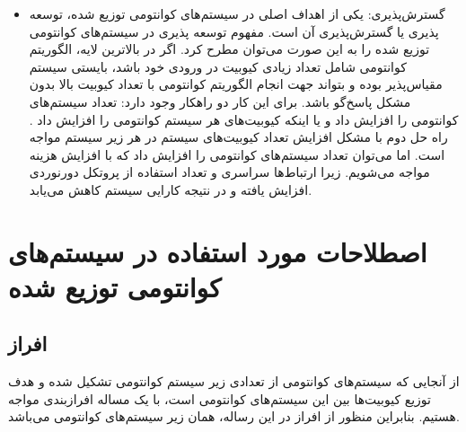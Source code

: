 \begin{itemize}
\item
گسترش‌پذیری: یکی از اهداف اصلی در سیستم‌های کوانتومی توزیع شده، توسعه پذیری یا گسترش‌پذیری آن است. مفهوم توسعه پذیری در سیستم‌های کوانتومی توزیع شده را به این صورت می‌توان مطرح کرد. اگر در بالاترین لایه، الگوریتم کوانتومی شامل تعداد زیادی کیوبیت در ورودی خود باشد، بایستی سیستم مقیاس‌پذیر بوده و بتواند جهت انجام الگوریتم کوانتومی با تعداد کیوبیت بالا بدون مشکل پاسخ‌گو باشد. برای این کار دو راهکار وجود دارد: تعداد سیستم‌های کوانتومی را افزایش داد  و یا اینکه کیوبیت‌های هر سیستم کوانتومی را افزایش داد . راه حل دوم با مشکل افزایش تعداد کیوبیت‌های سیستم در هر زیر سیستم مواجه است. اما ‌می‌توان تعداد سیستم‌های کوانتومی را افزایش داد که با افزایش هزینه مواجه می‌شویم. زیرا ارتباط‌ها سراسری و تعداد استفاده از پروتکل دورنوردی افزایش یافته و در نتیجه کارایی سیستم کاهش می‌یابد. 
\end{itemize}





\section{ اصطلاحات مورد استفاده در سیستم‌های کوانتومی توزیع شده}
\subsection{افراز}
از آنجایی که سیستم‌های کوانتومی از تعدادی زیر سیستم کوانتومی تشکیل شده و هدف توزیع کیوبیت‌‌ها بین این سیستم‌های کوانتومی است، با یک مساله افرازبندی مواجه هستیم. بنابراین منظور از افراز در این رساله، همان زیر سیستم‌های کوانتومی می‌باشد.
 

